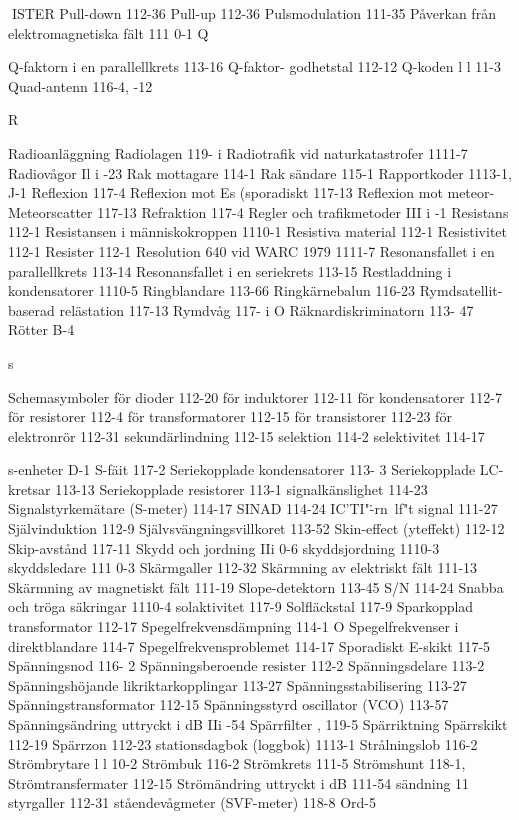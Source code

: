 \documentclass[a4paper,twoside,twocolumn,openright]{book}
\begin{document}
{{{{{{{{{{{ISTER
Pull-down 112-36
Pull-up 112-36
Pulsmodulation 111-35
Påverkan från elektromagnetiska fält 111 0-1
Q

Q-faktorn i en parallellkrets 113-16
Q-faktor- godhetstal 112-12
Q-koden l l 11-3
Quad-antenn 116-4, -12

R

Radioanläggning
Radiolagen 119- i
Radiotrafik vid naturkatastrofer 1111-7
Radiovågor Il i -23
Rak mottagare 114-1
Rak sändare 115-1
Rapportkoder 1113-1, J-1
Reflexion 117-4
Reflexion mot Es (sporadiskt
117-13
Reflexion mot meteor- Meteorscatter 117-13
Refraktion 117-4
Regler och trafikmetoder III i -1
Resistans 112-1
Resistansen i människokroppen 1110-1
Resistiva material 112-1
Resistivitet 112-1
Resister 112-1
Resolution 640 vid WARC 1979 1111-7
Resonansfallet i en parallellkrets 113-14
Resonansfallet i en seriekrets 113-15
Restladdning i kondensatorer 1110-5
Ringblandare 113-66
Ringkärnebalun 116-23
Rymdsatellit-baserad relästation 117-13
Rymdvåg 117- i O
Räknardiskriminatorn 113- 47
Rötter B-4

s

Schemasymboler
för dioder 112-20
för induktorer 112-11
för kondensatorer 112-7
för resistorer 112-4
för transformatorer 112-15
för transistorer 112-23
för elektronrör 112-31
sekundärlindning 112-15
selektion 114-2
selektivitet 114-17

s-enheter D-1
S-fäit 117-2
Seriekopplade kondensatorer 113- 3
Seriekopplade LC-kretsar 113-13
Seriekopplade resistorer 113-1
signalkänslighet 114-23
Signalstyrkemätare (S-meter) 114-17
SINAD 114-24
IC'TI"\.-rn~lf"t signal 111-27
Självinduktion 112-9
Självsvängningsvillkoret 113-52
Skin-effect (yteffekt) 112-12
Skip-avstånd 117-11
Skydd och jordning IIi 0-6
skyddsjordning 1110-3
skyddsledare 111 0-3
Skärmgaller 112-32
Skärmning av elektriskt fält 111-13
Skärmning av magnetiskt fält 111-19
Slope-detektorn 113-45
S/N 114-24
Snabba och tröga säkringar 1110-4
solaktivitet 117-9
Solfläckstal 117-9
Sparkopplad transformator 112-17
Spegelfrekvensdämpning 114-1 O
Spegelfrekvenser i direktblandare 114-7
Spegelfrekvensproblemet 114-17
Sporadiskt E-skikt 117-5
Spänningsnod 116- 2
Spänningsberoende resister 112-2
Spänningsdelare 113-2
Spänningshöjande likriktarkopplingar 113-27
Spänningsstabilisering 113-27
Spänningstransformator 112-15
Spänningsstyrd oscillator (VCO) 113-57
Spänningsändring uttryckt i dB IIi -54
Spärrfilter
, 119-5
Spärriktning
Spärrskikt 112-19
Spärrzon 112-23
stationsdagbok (loggbok) 1113-1
Strålningslob 116-2
Strömbrytare l l 10-2
Strömbuk 116-2
Strömkrets 111-5
Strömshunt 118-1,
Strömtransfermater 112-15
Strömändring uttryckt i dB 111-54
sändning 11
styrgaller 112-31
ståendevågmeter (SVF-meter) 118-8
Ord-5

}}}}}}}}}}}
\end{document}
